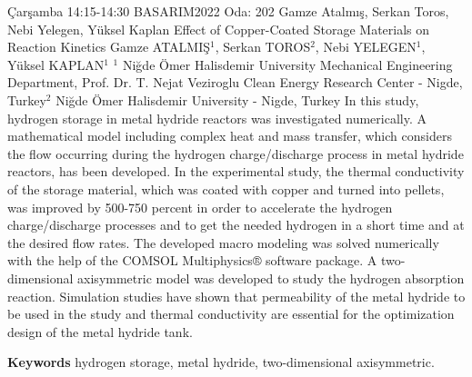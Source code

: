 
    \begin{abstract_basarim}
    {Çarşamba 14:15-14:30}
    {BASARIM2022}
    {Oda: 202}
    {Gamze Atalmış, Serkan Toros, Nebi Yelegen, Yüksel Kaplan}
    {Effect of Copper-Coated Storage Materials on Reaction Kinetics}
    {%
    Gamze ATALMIŞ$^{1}$, Serkan TOROS$^{2}$, Nebi YELEGEN$^{1}$, Yüksel KAPLAN$^{1}$}
    {%
    }
    {%
    $^1$ Niğde Ömer Halisdemir University Mechanical Engineering Department, Prof. Dr. T. Nejat Veziroglu Clean Energy Research Center - Nigde, Turkey\newline{}$^2$ Niğde Ömer Halisdemir University - Nigde, Turkey}
    In this study, hydrogen storage in metal hydride reactors was investigated numerically. A mathematical model including complex heat and mass transfer, which considers the flow occurring during the hydrogen charge/discharge process in metal hydride reactors, has been developed. In the experimental study, the thermal conductivity of the storage material, which was coated with copper and turned into pellets, was improved by 500-750 percent in order to accelerate the hydrogen charge/discharge processes and to get the needed hydrogen in a short time and at the desired flow rates. The developed macro modeling was solved numerically with the help of the COMSOL Multiphysics® software package. A two-dimensional axisymmetric model was developed to study the hydrogen absorption reaction. Simulation studies have shown that permeability of the metal hydride to be used in the study and thermal conductivity are essential for the optimization design of the metal hydride tank. 
    
        \textbf{Keywords} \newline{}hydrogen storage, metal hydride, two-dimensional axisymmetric.
    \end{abstract_basarim}
    